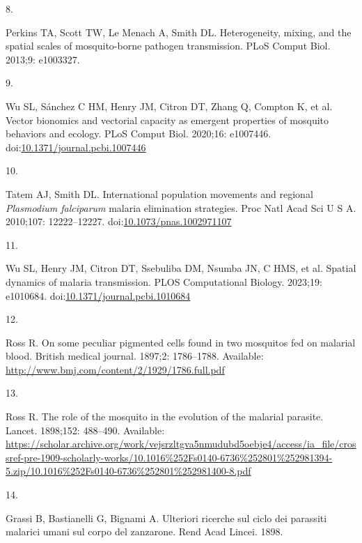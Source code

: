 \documentclass[
]{book}
\newlength{\cslhangindent}
\newlength{\csllabelwidth}
\newlength{\cslentryspacingunit} %
\newenvironment{CSLReferences}[2] %
 {%
  \setlength{\parindent}{0pt}
  \ifodd #1
  \let\oldpar\par
  \def\par{\hangindent=\cslhangindent\oldpar}
  \fi
  \setlength{\parskip}{#2\cslentryspacingunit}
 }%
 {}
\newcommand{\CSLLeftMargin}[1]{\parbox[t]{\csllabelwidth}{#1}}
\newcommand{\CSLRightInline}[1]{\parbox[t]{\linewidth - \csllabelwidth}{#1}\break}
\begin{document}
\begin{CSLReferences}{0}{0}
\leavevmode{}%
\CSLLeftMargin{8. }%
\CSLRightInline{Perkins TA, Scott TW, Le Menach A, Smith DL. Heterogeneity, mixing, and the spatial scales of mosquito-borne pathogen transmission. PLoS Comput Biol. 2013;9: e1003327. }

\leavevmode{}%
\CSLLeftMargin{9. }%
\CSLRightInline{Wu SL, Sánchez C HM, Henry JM, Citron DT, Zhang Q, Compton K, et al. Vector bionomics and vectorial capacity as emergent properties of mosquito behaviors and ecology. PLoS Comput Biol. 2020;16: e1007446. doi:\href{https://doi.org/10.1371/journal.pcbi.1007446}{10.1371/journal.pcbi.1007446}}

\leavevmode{}%
\CSLLeftMargin{10. }%
\CSLRightInline{Tatem AJ, Smith DL. International population movements and regional \emph{{Plasmodium} falciparum} malaria elimination strategies. Proc Natl Acad Sci U S A. 2010;107: 12222--12227. doi:\href{https://doi.org/10.1073/pnas.1002971107}{10.1073/pnas.1002971107}}

\leavevmode{}%
\CSLLeftMargin{11. }%
\CSLRightInline{Wu SL, Henry JM, Citron DT, Ssebuliba DM, Nsumba JN, C HMS, et al. Spatial dynamics of malaria transmission. PLOS Computational Biology. 2023;19: e1010684. doi:\href{https://doi.org/10.1371/journal.pcbi.1010684}{10.1371/journal.pcbi.1010684}}

\leavevmode{}%
\CSLLeftMargin{12. }%
\CSLRightInline{Ross R. On some peculiar pigmented cells found in two mosquitos fed on malarial blood. British medical journal. 1897;2: 1786--1788. Available: \url{http://www.bmj.com/content/2/1929/1786.full.pdf}}

\leavevmode{}%
\CSLLeftMargin{13. }%
\CSLRightInline{Ross R. The role of the mosquito in the evolution of the malarial parasite. Lancet. 1898;152: 488--490. Available: \url{https://scholar.archive.org/work/vejsrzltgva5nmudubd5oebje4/access/ia_file/crossref-pre-1909-scholarly-works/10.1016\%252Fs0140-6736\%252801\%252981394-5.zip/10.1016\%252Fs0140-6736\%252801\%252981400-8.pdf}}

\leavevmode{}%
\CSLLeftMargin{14. }%
\CSLRightInline{Grassi B, Bastianelli G, Bignami A. Ulteriori ricerche sul ciclo dei parassiti malarici umani sul corpo del zanzarone. Rend Acad Lincei. 1898. }


\end{CSLReferences}
\end{document}
